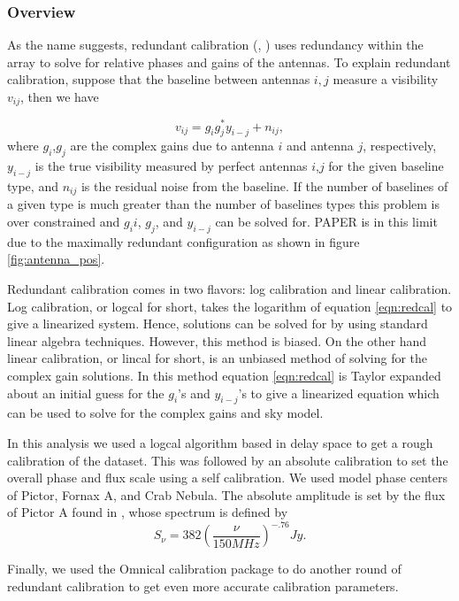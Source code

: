 \documentclass[twocolumn,numberedappendix]{emulateapj}
\begin{document}
{\subsubsection{Overview}
As the name suggests, redundant calibration (\cite{liu_et_al2010},
\cite{zheng_et_al2014}) uses redundancy within the array to solve for relative
phases and gains of the antennas. To explain redundant calibration, suppose that
the baseline between antennas $i,j$ measure a visibility $v_{ij}$, then we have 

\begin{equation}\label{eqn:redcal}
    v_{ij} = g_{i}g_{j}^{*}y_{i-j} + n_{ij},   
\end{equation}
where $g_{i}$,$g_{j}$ are the complex gains due to antenna $i$ and antenna $j$,
respectively, $y_{i-j}$ is the true visibility measured by perfect antennas
$i$,$j$ for the given baseline type, and $n_{ij}$ is the residual noise from
the baseline.  If the number of baselines of a given type is much greater than
the number of baselines types this problem is over constrained and $g_{i}i$,
$g_{j}$, and $y_{i-j}$ can be solved for. PAPER is in this limit due to the
maximally redundant configuration as shown in figure \ref{fig:antenna_pos}. 

Redundant calibration comes in two flavors: log calibration and linear
calibration. Log calibration, or logcal for short, takes the logarithm of
equation \ref{eqn:redcal} to give a linearized system. Hence, solutions can be
solved for by using standard linear algebra techniques. However, this method is
biased. On the other hand linear calibration, or lincal for short, is an
unbiased method of solving for the complex gain solutions. In this method
equation \ref{eqn:redcal} is Taylor expanded about an initial guess for the
$g_{i}$'s and $y_{i-j}$'s to give a linearized equation which can be used to
solve for the complex gains and sky model. 

In this analysis we used a logcal algorithm based in delay space to get a rough
calibration of the dataset. This was followed by an absolute calibration to set
the overall phase and flux scale using a self calibration. We used model phase
centers of Pictor, Fornax A, and Crab Nebula. The absolute amplitude is set
by the flux of Pictor A found in \cite{jacobs_et_al2013}, whose spectrum is
defined by 
\begin{equation}
    S_{\nu} = 382(\frac{\nu}{150 MHz})^{-.76} Jy.
\end{equation}

Finally, we used the Omnical calibration package to do another round of
redundant calibration to get even more accurate calibration parameters.

}
\end{document}
